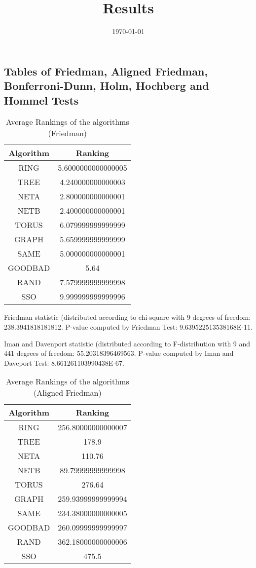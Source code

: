 \documentclass[a4paper,10pt]{article}
\title{Results}
\author{}
\date{\today}
\begin{document}
\begin{landscape}
\oddsidemargin 0in \topmargin 0in\maketitle
\section{Tables of Friedman, Aligned Friedman, Bonferroni-Dunn, Holm, Hochberg and Hommel Tests}
\begin{table}[!htp]
\centering
\caption{Average Rankings of the algorithms (Friedman)
}\begin{tabular}{c|c}
Algorithm&Ranking\\
\hline
 RING&5.6000000000000005\\
 TREE&4.240000000000003\\
 NETA&2.800000000000001\\
 NETB&2.400000000000001\\
 TORUS&6.079999999999999\\
 GRAPH&5.659999999999999\\
 SAME&5.000000000000001\\
 GOODBAD&5.64\\
 RAND&7.579999999999998\\
 SSO&9.999999999999996\\
\end{tabular}
\end{table}


Friedman statistic (distributed according to chi-square with 9 degrees of freedom: 238.3941818181812. 
P-value computed by Friedman Test: 9.639522513538168E-11.\newline

Iman and Davenport statistic (distributed according to F-distribution with 9 and 441 degrees of freedom: 55.20318396469563. 
P-value computed by Iman and Daveport Test: 8.661261103990438E-67.\newline


\newpage

\begin{table}[!htp]
\centering
\caption{Average Rankings of the algorithms (Aligned Friedman)
}\begin{tabular}{c|c}
Algorithm&Ranking\\
\hline
 RING&256.80000000000007\\
 TREE&178.9\\
 NETA&110.76\\
 NETB&89.79999999999998\\
 TORUS&276.64\\
 GRAPH&259.93999999999994\\
 SAME&234.38000000000005\\
 GOODBAD&260.09999999999997\\
 RAND&362.18000000000006\\
 SSO&475.5\\
\end{tabular}
\end{table}



\end{landscape}
\end{document}
